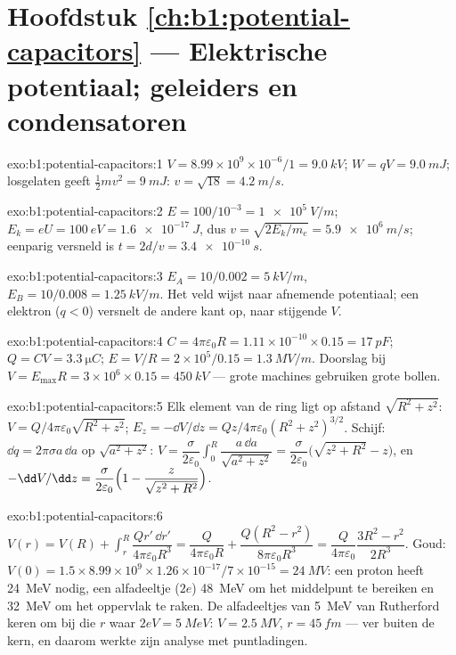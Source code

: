 \section*{Hoofdstuk \ref{ch:b1:potential-capacitors} --- Elektrische potentiaal; geleiders en condensatoren}

\begin{solution}{exo:b1:potential-capacitors:1}
$V = 8.99 \times 10^9 \times 10^{-6}/1 = \qty{9.0}{kV}$; $W = qV = \qty{9.0}{mJ}$;
losgelaten geeft $\tfrac12mv^2 = \qty{9}{mJ}$: $v = \sqrt{18} = \qty{4.2}{m/s}$.
\end{solution}

\begin{solution}{exo:b1:potential-capacitors:2}
$E = 100/10^{-3} = \qty{1e5}{V/m}$; $E_k = eU = \qty{100}{eV} = \qty{1.6e-17}{J}$,
dus $v = \sqrt{2E_k/m_e} = \qty{5.9e6}{m/s}$; eenparig versneld is
$t = 2d/v = \qty{3.4e-10}{s}$.
\end{solution}

\begin{solution}{exo:b1:potential-capacitors:3}
$E_A = 10/0.002 = \qty{5}{kV/m}$, $E_B = 10/0.008 = \qty{1.25}{kV/m}$. Het
veld wijst naar afnemende potentiaal; een elektron ($q < 0$)
versnelt de andere kant op, naar stijgende $V$.
\end{solution}

\begin{solution}{exo:b1:potential-capacitors:4}
$C = 4\pi\varepsilon_0R = 1.11 \times 10^{-10} \times 0.15 = \qty{17}{pF}$; $Q = CV =
\qty{3.3}{\micro C}$; $E = V/R = 2 \times 10^5/0.15 = \qty{1.3}{MV/m}$. Doorslag
bij $V = E_{\max}R = 3 \times 10^6 \times 0.15 = \qty{450}{kV}$ --- grote machines
gebruiken grote bollen.
\end{solution}

\begin{solution}{exo:b1:potential-capacitors:5}
Elk element van de ring ligt op afstand $\sqrt{R^2 + z^2}$: $V =
Q/4\pi\varepsilon_0\sqrt{R^2 + z^2}$; $E_z = -\dd V/\dd z = Qz/4\pi\varepsilon_0(R^2 +
z^2)^{3/2}$. Schijf: $\dd q = 2\pi\sigma a\,\dd a$ op $\sqrt{a^2 + z^2}$: $V =
\dfrac{\sigma}{2\varepsilon_0}\displaystyle\int_0^R\dfrac{a\,\dd a}{\sqrt{a^2 + z^2}} =
\dfrac{\sigma}{2\varepsilon_0}\bigl(\sqrt{z^2 + R^2} - z\bigr)$, en $-\dd V/\dd z =
\dfrac{\sigma}{2\varepsilon_0}\Bigl(1 - \dfrac{z}{\sqrt{z^2 + R^2}}\Bigr)$.
\end{solution}

\begin{solution}{exo:b1:potential-capacitors:6}
$V(r) = V(R) + \displaystyle\int_r^R\dfrac{Qr'\,\dd r'}{4\pi\varepsilon_0R^3} =
\dfrac{Q}{4\pi\varepsilon_0R} + \dfrac{Q(R^2 - r^2)}{8\pi\varepsilon_0R^3} = \dfrac{Q}{4\pi\varepsilon_0}
\dfrac{3R^2 - r^2}{2R^3}$. Goud: $V(0) = 1.5 \times 8.99 \times 10^9 \times 1.26 \times
10^{-17}/7 \times 10^{-15} = \qty{24}{MV}$: een proton heeft \qty{24}{MeV} nodig, een alfadeeltje
($2e$) \qty{48}{MeV} om het middelpunt te bereiken en \qty{32}{MeV} om het
oppervlak te raken. De alfadeeltjes van \qty{5}{MeV} van Rutherford keren om bij die $r$ waar $2eV =
\qty{5}{MeV}$: $V = \qty{2.5}{MV}$, $r = \qty{45}{fm}$ --- ver buiten de
kern, en daarom werkte zijn analyse met puntladingen.
\end{solution}

